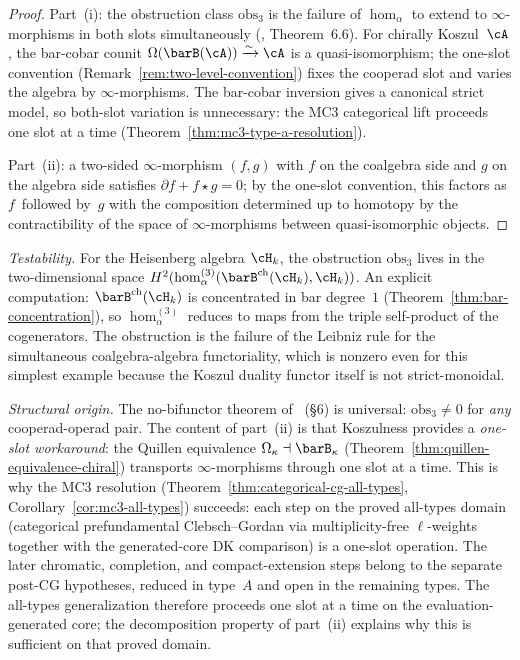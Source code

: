 \begin{proof}
Part~(i): the obstruction class $\mathrm{obs}_3$ is the failure of
$\operatorname{hom}_\alpha$ to extend to $\infty$-morphisms in both
slots simultaneously (\cite{RNW19}, Theorem~6.6). For chirally
Koszul~$\cA$, the bar-cobar counit
$\Omega(\barB(\cA)) \xrightarrow{\sim} \cA$ is a quasi-isomorphism;
the one-slot convention
(Remark~\ref{rem:two-level-convention}) fixes the cooperad slot and
varies the algebra by $\infty$-morphisms. The bar-cobar inversion
gives a canonical strict model, so both-slot variation is
unnecessary: the MC3 categorical lift proceeds one slot at a time
(Theorem~\ref{thm:mc3-type-a-resolution}).

Part~(ii): a two-sided $\infty$-morphism $(f, g)$ with $f$ on the
coalgebra side and $g$ on the algebra side satisfies
$\partial f + f \star g = 0$; by the one-slot convention, this
factors as $f$~followed by~$g$ with the composition determined up
to homotopy by the contractibility of the space of
$\infty$-morphisms between quasi-isomorphic objects.
\end{proof}

\begin{remark}
\label{rem:bifunctor-analysis}
\emph{Testability.}\;
For the Heisenberg algebra $\cH_k$, the obstruction
$\mathrm{obs}_3$ lives in the two-dimensional space
$H^2(\operatorname{hom}_\alpha^{(3)}
 (\barB^{\mathrm{ch}}(\cH_k), \cH_k))$.
An explicit computation: $\barB^{\mathrm{ch}}(\cH_k)$ is
concentrated in bar degree~$1$
(Theorem~\ref{thm:bar-concentration}),
so $\operatorname{hom}_\alpha^{(3)}$ reduces to maps from
the triple self-product of the cogenerators. The obstruction is
the failure of the Leibniz rule for the simultaneous
coalgebra-algebra functoriality, which is nonzero even for this
simplest example because the Koszul duality functor itself is
not strict-monoidal.

\emph{Structural origin.}\;
The no-bifunctor theorem of~\cite{RNW19} (\S6) is universal:
$\mathrm{obs}_3 \neq 0$ for \emph{any} cooperad-operad pair.
The content of part~(ii) is that Koszulness provides a
\emph{one-slot workaround}: the Quillen equivalence
$\Omega_\kappa \dashv \barB_\kappa$
(Theorem~\ref{thm:quillen-equivalence-chiral})
transports $\infty$-morphisms through one slot at a time.
This is why the MC3 resolution
(Theorem~\ref{thm:categorical-cg-all-types}, Corollary~\ref{cor:mc3-all-types}) succeeds: each step
on the proved all-types domain
\textup{(}categorical prefundamental Clebsch--Gordan via
multiplicity-free $\ell$-weights together with the generated-core DK
comparison\textup{)} is a one-slot operation. The later chromatic,
completion, and compact-extension steps belong to the separate
post-CG hypotheses, reduced in type~$A$ and open in the remaining
types.
The all-types generalization therefore proceeds one slot at a time on
the evaluation-generated core; the decomposition property of
part~(ii) explains why this is sufficient on that proved domain.
\end{remark}

